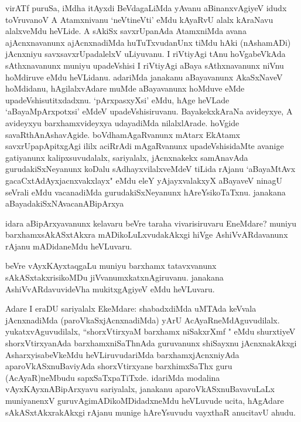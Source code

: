\begin{artha}
virATf puruSa, iMdha itAyxdi BeVdagaLiMda yAvanu aBinanxvAgiyeV idudx toVruvanoV A Atamxnivanu `neVtineVti' eMdu kAyaRvU alalx kAraNavu alalxveMdu heVLide. A sAkiSx savxrUpanAda AtamxniMda avana ajAcnxnavanunx ajAcnxnadiMda huTuTxvudanUnx tiMdu hAki (nAshamADi) jAcnxniyu savxsavxrUpadalelxV uLiyuvanu. I riVtiyAgi tAnu hoVgabeVkAda sAthxnavanunx muniyu upadeVshisi I riVtiyAgi aBaya sAthxnavanunx niVnu hoMdiruve eMdu heVLidanu. adariMda janakanu aBayavanunx AkaSxNaveV hoMdidanu, hAgilalxvAdare muMde aBayavanunx hoMduve eMde upadeVshisutitxdadxnu. `pArxpasxyXsi' eMdu, hAge heVLade `aBayaMpArxpotx\s si' eMdeV upadeVshisiruvanu. BayakekxkAraNa avideyxye, A avideyxyu barxhamxvideyxya udayadiMda nilalxlArade. hoVgide savaRthAnAshavAgide. boVdhamAgaRvanunx mAtarx EkAtamx savxrUpapApitxgAgi ililx aciRrAdi mAgaRvanunx upadeVshisidaMte avanige gatiyanunx kalipxsuvudalalx, sariyalalx, jAcnxnakekx samAnavAda gurudakiSxNeyanunx koDalu sAdhayxvilalxveMdeV tiLida rAjanu `aBayaMtAvx gacaCxtAdAyxjacnxvakxlayx" eMdu eleY yAjayxvalakxyX aBayaveV ninagU seVrali eMdu vacanadiMda gurudakiSxNeyanunx hAreYsikoTaTxnu. janakana aBayadakiSxNAvacanABipArxya
\end{artha}


\begin{artha}
idara aBipArxyavanunx kelavaru beVre taraha vivarisiruvaru EneMdare? muniyu barxhamxsAkASxtAkxra mADikoLuLxvudakAkxgi hiVge AshiVvARdavanunx rAjanu mADidaneMdu heVLuvaru.
\end{artha}

\begin{artha}
beVre vAyxKAyxtaqgaLu muniyu barxhamx tatavxvanunx sAkASxtakxrisikoMDu jiVvanumxkatxnAgiruvanu. janakana AshiVvARdavuvideVha mukitxgAgiyeV eMdu heVLuvaru.
\end{artha}

\begin{artha}
Adare I eraDU sariyalalx EkeMdare: shabadxdiMda uMTAda keVvala jAcnxnadiMda (paroVkaSxjAcnxnadiMda) yArU AcAyaRneMdAguvudilalx. yukatxvAguvudilalx, ``shorxVtirxyaM barxhamx niSakxrXmf " eMdu shurxtiyeV shorxVtirxyanAda barxhamxniSaThnAda guruvanunx shiSayxnu jAcnxnakAkxgi AsharxyisabeVkeMdu heVLiruvudariMda barxhamxjAcnxniyAda aparoVkASxnuBaviyAda shorxVtirxyane barxhimxSaThx guru (AcAyaR)neMbudu sapxSaTxpaTiTxde. idariMda modalina vAyxKAyxnABipArxyavu sariyalalx, janakanu aparoVkASxnuBavavuLaLx muniyanenxV guruvAgimADikoMDidadxneMdu heVLuvude ucita, hAgAdare sAkASxtAkxrakAkxgi rAjanu munige hAreYsuvudu vayxthaR anucitavU ahudu. 
\end{artha}

